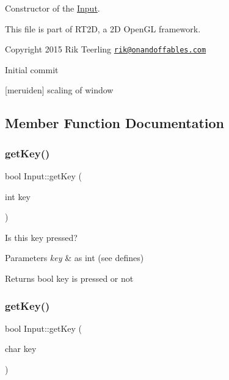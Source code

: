 Constructor of the \hyperlink{class_input}{Input}. 

This file is part of R\+T2D, a 2D Open\+GL framework.


\begin{DoxyItemize}
\item Copyright 2015 Rik Teerling \href{mailto:rik@onandoffables.com}{\tt rik@onandoffables.\+com}
\begin{DoxyItemize}
\item Initial commit
\item \mbox{[}meruiden\mbox{]} scaling of window 
\end{DoxyItemize}
\end{DoxyItemize}

\subsection{Member Function Documentation}
\mbox{\label{class_input_a62ca94f9d79e246423a8a6e46d6e88dc}} 
\subsubsection{\texorpdfstring{get\+Key()}{getKey()}\hspace{0.1cm}{\footnotesize\ttfamily [1/2]}}
{\footnotesize\ttfamily bool Input\+::get\+Key (\begin{DoxyParamCaption}\item[{int}]{key }\end{DoxyParamCaption})\hspace{0.3cm}{\ttfamily [inline]}}



Is this key pressed? 


\begin{DoxyParams}{Parameters}
{\em key} & as int (see defines) \\
\hline
\end{DoxyParams}
\begin{DoxyReturn}{Returns}
bool key is pressed or not 
\end{DoxyReturn}
\mbox{\label{class_input_a9759385ef5234448861d0330a205c40b}} 
\subsubsection{\texorpdfstring{get\+Key()}{getKey()}\hspace{0.1cm}{\footnotesize\ttfamily [2/2]}}
{\footnotesize\ttfamily bool Input\+::get\+Key (\begin{DoxyParamCaption}\item[{char}]{key }\end{DoxyParamCaption})\hspace{0.3cm}{\ttfamily [inline]}}



